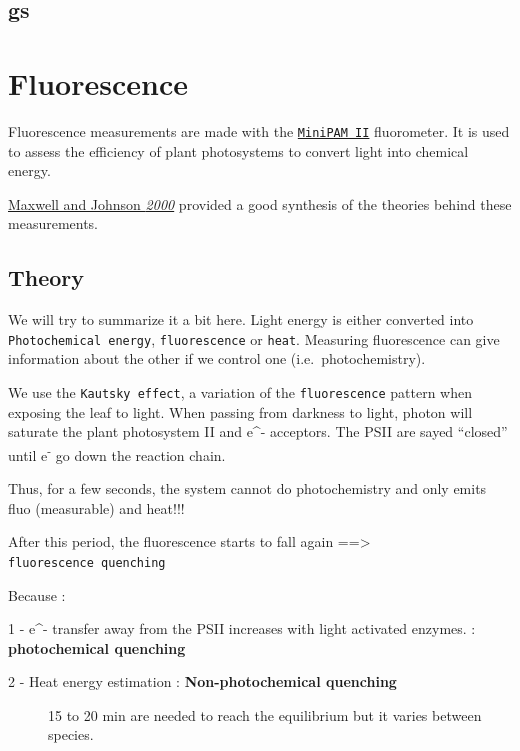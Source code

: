 \documentclass[
  12pt,
  american,
  a4paper,
  extrafontsizes,onecolumn,openright
  ]{memoir}
\begin{document}
\hypertarget{gs}{%
\section{gs}\label{gs}}

\hypertarget{fluorescence}{%
\chapter{Fluorescence}\label{fluorescence}}

Fluorescence measurements are made with the \href{document/machine/MiniPAM\%20II/minipamexp.pdf}{\texttt{MiniPAM\ II}} fluorometer.
It is used to assess the efficiency of plant photosystems to convert light into chemical energy.

\href{document/trait/fluorescence/Maxwell\%20and\%20Johnson\%20-\%202000\%20-\%20Chlorophyll\%20fluorescence—a\%20practical\%20guide.pdf}{Maxwell and Johnson \emph{2000}} provided a good synthesis of the theories behind these measurements.

\hypertarget{theory}{%
\section{Theory}\label{theory}}

We will try to summarize it a bit here.
Light energy is either converted into \texttt{Photochemical\ energy}, \texttt{fluorescence} or \texttt{heat}.
Measuring fluorescence can give information about the other if we control one (i.e.~photochemistry).

We use the \texttt{Kautsky\ effect}, a variation of the \texttt{fluorescence} pattern when exposing the leaf to light.
When passing from darkness to light, photon will saturate the plant photosystem II and e\^{}- acceptors.
The PSII are sayed \enquote{closed} until e\textsuperscript{-} go down the reaction chain.

Thus, for a few seconds, the system cannot do photochemistry and only emits fluo (measurable) and heat!!!

After this period, the fluorescence starts to fall again ==\textgreater{} \texttt{fluorescence\ quenching}

Because :

1 - e\^{}- transfer away from the PSII increases with light activated enzymes. : \textbf{photochemical quenching}

\begin{description}
\item[2 - Heat energy estimation : \textbf{Non-photochemical quenching}]
15 to 20 min are needed to reach the equilibrium but it varies between species.
\end{description}
\end{document}
